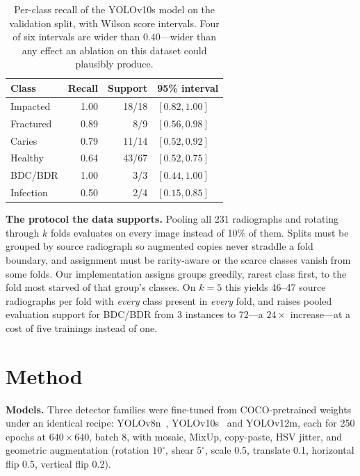 \documentclass[10pt,twocolumn]{article}
\newcommand{\clsname}[1]{\textsf{#1}}
\begin{document}
\begin{table}[t]
\centering\small
\begin{tabular}{lrrl}
\toprule
\textbf{Class} & \textbf{Recall} & \textbf{Support} & \textbf{95\% interval} \\
\midrule
\clsname{Impacted}  & 1.00 & 18/18 & $[0.82, 1.00]$ \\
\clsname{Fractured} & 0.89 & \phantom{0}8/9  & $[0.56, 0.98]$ \\
\clsname{Caries}    & 0.79 & 11/14 & $[0.52, 0.92]$ \\
\clsname{Healthy}   & 0.64 & 43/67 & $[0.52, 0.75]$ \\
\clsname{BDC/BDR}   & 1.00 & \phantom{0}3/3   & $[0.44, 1.00]$ \\
\clsname{Infection} & 0.50 & \phantom{0}2/4   & $[0.15, 0.85]$ \\
\bottomrule
\end{tabular}
\caption{Per-class recall of the YOLOv10s model on the validation split, with
Wilson score intervals. Four of six intervals are wider than 0.40---wider than
any effect an ablation on this dataset could plausibly produce.}
\label{tab:wilson}
\end{table}

\textbf{The protocol the data supports.} Pooling all 231 radiographs and
rotating through $k$ folds evaluates on every image instead of 10\% of them.
Splits must be grouped by source radiograph so augmented copies never straddle a
fold boundary, and assignment must be rarity-aware or the scarce classes vanish
from some folds. Our implementation assigns groups greedily, rarest class first,
to the fold most starved of that group's classes. On $k=5$ this yields
46--47 source radiographs per fold with \emph{every} class present in
\emph{every} fold, and raises pooled evaluation support for \clsname{BDC/BDR}
from 3 instances to 72---a $24\times$ increase---at a cost of five trainings
instead of one.

\section{Method}

\textbf{Models.} Three detector families were fine-tuned from COCO-pretrained
weights under an identical recipe: YOLOv8n~\cite{jocher2023ultralytics},
YOLOv10s~\cite{wang2024yolov10} and YOLOv12m, each for 250 epochs at
$640\times640$, batch 8, with mosaic, MixUp, copy-paste, HSV jitter, and
geometric augmentation (rotation $10^\circ$, shear $5^\circ$, scale 0.5,
translate 0.1, horizontal flip 0.5, vertical flip 0.2).
\end{document}
